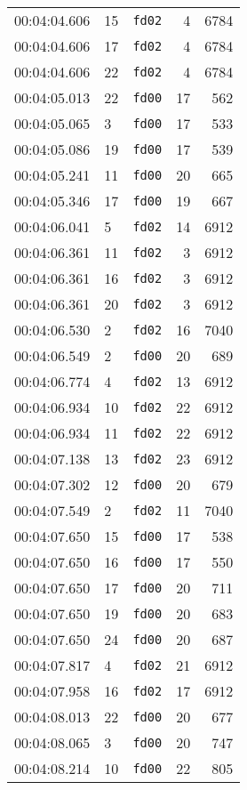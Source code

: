 \documentclass{article}
\begin{document}
\begin{longtable}{lllrr}
00:04:04.606 & 15 & \texttt{fd02} & 4 & 6784 \\
00:04:04.606 & 17 & \texttt{fd02} & 4 & 6784 \\
00:04:04.606 & 22 & \texttt{fd02} & 4 & 6784 \\
00:04:05.013 & 22 & \texttt{fd00} & 17 & 562 \\
00:04:05.065 & 3 & \texttt{fd00} & 17 & 533 \\
00:04:05.086 & 19 & \texttt{fd00} & 17 & 539 \\
00:04:05.241 & 11 & \texttt{fd00} & 20 & 665 \\
00:04:05.346 & 17 & \texttt{fd00} & 19 & 667 \\
00:04:06.041 & 5 & \texttt{fd02} & 14 & 6912 \\
00:04:06.361 & 11 & \texttt{fd02} & 3 & 6912 \\
00:04:06.361 & 16 & \texttt{fd02} & 3 & 6912 \\
00:04:06.361 & 20 & \texttt{fd02} & 3 & 6912 \\
00:04:06.530 & 2 & \texttt{fd02} & 16 & 7040 \\
00:04:06.549 & 2 & \texttt{fd00} & 20 & 689 \\
00:04:06.774 & 4 & \texttt{fd02} & 13 & 6912 \\
00:04:06.934 & 10 & \texttt{fd02} & 22 & 6912 \\
00:04:06.934 & 11 & \texttt{fd02} & 22 & 6912 \\
00:04:07.138 & 13 & \texttt{fd02} & 23 & 6912 \\
00:04:07.302 & 12 & \texttt{fd00} & 20 & 679 \\
00:04:07.549 & 2 & \texttt{fd02} & 11 & 7040 \\
00:04:07.650 & 15 & \texttt{fd00} & 17 & 538 \\
00:04:07.650 & 16 & \texttt{fd00} & 17 & 550 \\
00:04:07.650 & 17 & \texttt{fd00} & 20 & 711 \\
00:04:07.650 & 19 & \texttt{fd00} & 20 & 683 \\
00:04:07.650 & 24 & \texttt{fd00} & 20 & 687 \\
00:04:07.817 & 4 & \texttt{fd02} & 21 & 6912 \\
00:04:07.958 & 16 & \texttt{fd02} & 17 & 6912 \\
00:04:08.013 & 22 & \texttt{fd00} & 20 & 677 \\
00:04:08.065 & 3 & \texttt{fd00} & 20 & 747 \\
00:04:08.214 & 10 & \texttt{fd00} & 22 & 805 \\

\end{longtable}
\end{document}

